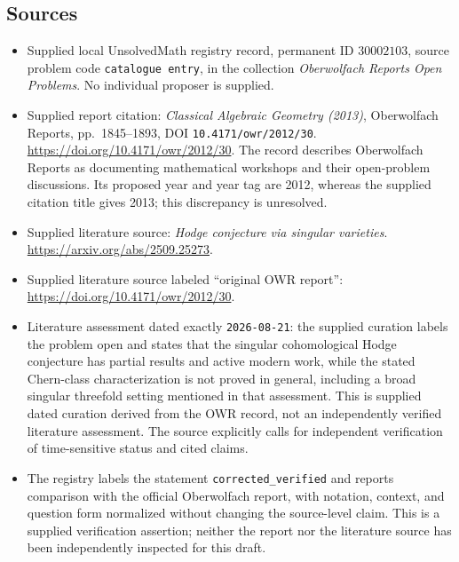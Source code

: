 \documentclass[11pt]{article}
\begin{document}
\subsection{Sources}
\begin{itemize}
\item Supplied local UnsolvedMath registry record, permanent ID \(30002103\), source problem code \texttt{catalogue entry}, in the collection \emph{Oberwolfach Reports Open Problems}. No individual proposer is supplied.
\item Supplied report citation: \emph{Classical Algebraic Geometry (2013)}, Oberwolfach Reports, pp.~1845--1893, DOI \texttt{10.4171/owr/2012/30}. \url{https://doi.org/10.4171/owr/2012/30}. The record describes Oberwolfach Reports as documenting mathematical workshops and their open-problem discussions. Its proposed year and year tag are 2012, whereas the supplied citation title gives 2013; this discrepancy is unresolved.
\item Supplied literature source: \emph{Hodge conjecture via singular varieties}. \url{https://arxiv.org/abs/2509.25273}.
\item Supplied literature source labeled ``original OWR report'': \url{https://doi.org/10.4171/owr/2012/30}.
\item Literature assessment dated exactly \texttt{2026-08-21}: the supplied curation labels the problem open and states that the singular cohomological Hodge conjecture has partial results and active modern work, while the stated Chern-class characterization is not proved in general, including a broad singular threefold setting mentioned in that assessment. This is supplied dated curation derived from the OWR record, not an independently verified literature assessment. The source explicitly calls for independent verification of time-sensitive status and cited claims.
\item The registry labels the statement \texttt{corrected\_verified} and reports comparison with the official Oberwolfach report, with notation, context, and question form normalized without changing the source-level claim. This is a supplied verification assertion; neither the report nor the literature source has been independently inspected for this draft.
\end{itemize}
\end{document}
